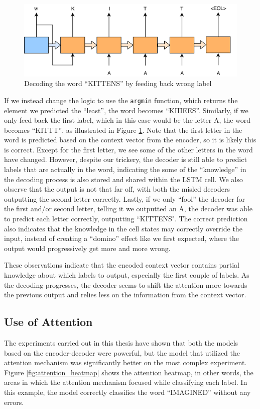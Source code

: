 \begin{figure}[ht]
    \centering
    \includegraphics[width=1\textwidth]{fig/results/kittens_wrong.png}
    \caption{Decoding the word ``KITTENS'' by feeding back wrong label}
    \label{fig:kittens_wrong}
\end{figure}

If we instead change the logic to use the {\tt argmin} function, which returns the element we predicted the ``least'', the word becomes ``KIIIEES''. Similarly, if we only feed back the first label, which in this case would be the letter A, the word becomes ``KITTT'', as illustrated in Figure \ref{fig:kittens_wrong}. Note that the first letter in the word is predicted based on the context vector from the encoder, so it is likely this is correct. Except for the first letter, we see some of the other letters in the word have changed. However, despite our trickery, the decoder is still able to predict labels that are actually in the word, indicating the some of the ``knowledge'' in the decoding process is also stored and shared within the LSTM cell. We also observe that the output is not that far off, with both the misled decoders outputting the second letter correctly. Lastly, if we only ``fool'' the decoder for the first and/or second letter, telling it we outputted an A, the decoder was able to predict each letter correctly, outputting ``KITTENS". The correct prediction also indicates that the knowledge in the cell states may correctly override the input, instead of creating a ``domino'' effect like we first expected, where the output would progressively get more and more wrong.

These observations indicate that the encoded context vector contains partial knowledge about which labels to output, especially the first couple of labels. As the decoding progresses, the decoder seems to shift the attention more towards the previous output and relies less on the information from the context vector.

\subsection{Use of Attention}
The experiments carried out in this thesis have shown that both the models based on the encoder-decoder were powerful, but the model that utilized the attention mechanism was significantly better on the most complex experiment. Figure \ref{fig:attention_heatmap} shows the attention heatmap, in other words, the areas in which the attention mechanism focused while classifying each label. In this example, the model correctly classifies the word ``IMAGINED'' without any errors. 

